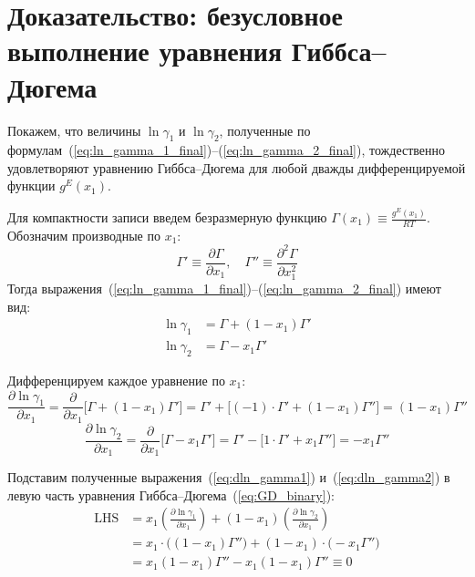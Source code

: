 \documentclass[12pt,a4paper]{article}
\begin{document}
\section{Доказательство: безусловное выполнение уравнения Гиббса--Дюгема}

Покажем, что величины $\ln \gamma_1$ и $\ln \gamma_2$, полученные по формулам~(\ref{eq:ln_gamma_1_final})--(\ref{eq:ln_gamma_2_final}), тождественно удовлетворяют уравнению Гиббса--Дюгема для любой дважды дифференцируемой функции $g^E(x_1)$.

Для компактности записи введем безразмерную функцию $\Gamma(x_1) \equiv \frac{g^E(x_1)}{RT}$. Обозначим производные по $x_1$:
\begin{equation}
    \Gamma' \equiv \frac{\partial \Gamma}{\partial x_1}, \quad \Gamma'' \equiv \frac{\partial^2 \Gamma}{\partial x_1^2}
\end{equation}
Тогда выражения~(\ref{eq:ln_gamma_1_final})--(\ref{eq:ln_gamma_2_final}) имеют вид:
\begin{align}
    \ln \gamma_1 &= \Gamma + (1 - x_1)\Gamma' \label{eq:gamma1_gamma_form} \\
    \ln \gamma_2 &= \Gamma - x_1\Gamma' \label{eq:gamma2_gamma_form}
\end{align}

Дифференцируем каждое уравнение по $x_1$:
\begin{equation}
    \frac{\partial \ln \gamma_1}{\partial x_1} = \frac{\partial}{\partial x_1} \Big[ \Gamma + (1 - x_1)\Gamma' \Big] = \Gamma' + \Big[ (-1) \cdot \Gamma' + (1 - x_1)\Gamma'' \Big] = (1 - x_1)\Gamma''
    \label{eq:dln_gamma1}
\end{equation}
\begin{equation}
    \frac{\partial \ln \gamma_2}{\partial x_1} = \frac{\partial}{\partial x_1} \Big[ \Gamma - x_1\Gamma' \Big] = \Gamma' - \Big[ 1 \cdot \Gamma' + x_1\Gamma'' \Big] = -x_1\Gamma''
    \label{eq:dln_gamma2}
\end{equation}

Подставим полученные выражения~(\ref{eq:dln_gamma1}) и~(\ref{eq:dln_gamma2}) в левую часть уравнения Гиббса--Дюгема~(\ref{eq:GD_binary}):
\begin{align}
    \text{LHS} &= x_1 \left(\frac{\partial \ln \gamma_1}{\partial x_1}\right) + (1 - x_1)\left(\frac{\partial \ln \gamma_2}{\partial x_1}\right) \nonumber \\
    &= x_1 \cdot \Big( (1 - x_1)\Gamma'' \Big) + (1 - x_1) \cdot \Big( -x_1\Gamma'' \Big) \nonumber \\
    &= x_1(1 - x_1)\Gamma'' - x_1(1 - x_1)\Gamma'' \equiv 0
\end{align}
\end{document}
